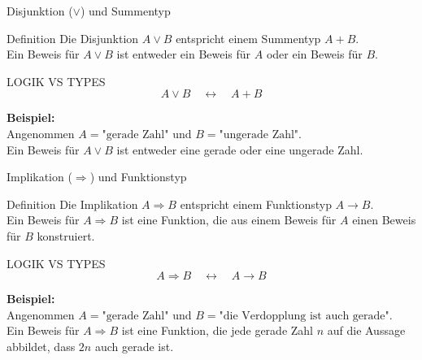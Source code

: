 \documentclass{beamer}
\begin{document}
\begin{frame}{Disjunktion (\(\vee\)) und Summentyp}
    \begin{block}{Definition}
        Die Disjunktion \( A \vee B \) entspricht einem Summentyp \( A + B \). \\
        Ein Beweis für \( A \vee B \) ist entweder ein Beweis für \( A \) oder ein Beweis für \( B \).
    \end{block}

    \begin{block}{LOGIK VS TYPES}
        \[
        A \vee B \quad \leftrightarrow \quad A + B
        \]
    \end{block}

    \textbf{Beispiel:} \\
    Angenommen \( A = \text{"gerade Zahl"} \) und \( B = \text{"ungerade Zahl"} \). \\
    Ein Beweis für \( A \vee B \) ist entweder eine gerade oder eine ungerade Zahl.
\end{frame}

\begin{frame}{Implikation (\(\Rightarrow\)) und Funktionstyp}
    \begin{block}{Definition}
        Die Implikation \( A \Rightarrow B \) entspricht einem Funktionstyp \( A \to B \). \\
        Ein Beweis für \( A \Rightarrow B \) ist eine Funktion, die aus einem Beweis für \( A \) einen Beweis für \( B \) konstruiert.
    \end{block}

    \begin{block}{LOGIK VS TYPES}
        \[
        A \Rightarrow B \quad \leftrightarrow \quad A \to B
        \]
    \end{block}

    \textbf{Beispiel:} \\
    Angenommen \( A = \text{"gerade Zahl"} \) und \( B = \text{"die Verdopplung ist auch gerade"} \). \\
    Ein Beweis für \( A \Rightarrow B \) ist eine Funktion, die jede gerade Zahl \( n \) auf die Aussage abbildet, dass \( 2n \) auch gerade ist.
\end{frame}
\end{document}
